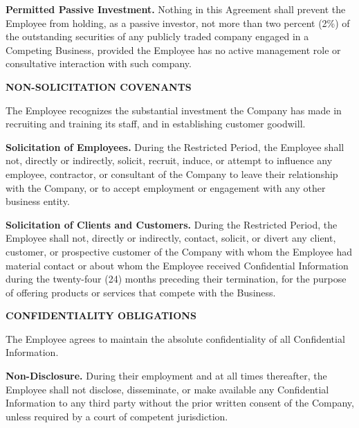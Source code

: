 \documentclass[11pt,a4paper]{article}
\begin{document}
\begin{clauses}
\begin{clauses}
        \item \textbf{Permitted Passive Investment.} Nothing in this Agreement shall prevent the Employee from holding, as a passive investor, not more than two percent (2\%) of the outstanding securities of any publicly traded company engaged in a Competing Business, provided the Employee has no active management role or consultative interaction with such company.
    \end{clauses}

    \item \textbf{NON-SOLICITATION COVENANTS}
    \label{sec:nonsolicit}
    
    The Employee recognizes the substantial investment the Company has made in recruiting and training its staff, and in establishing customer goodwill.
    
    \begin{clauses}
        \item \textbf{Solicitation of Employees.} During the Restricted Period, the Employee shall not, directly or indirectly, solicit, recruit, induce, or attempt to influence any employee, contractor, or consultant of the Company to leave their relationship with the Company, or to accept employment or engagement with any other business entity.
        
        \item \textbf{Solicitation of Clients and Customers.} During the Restricted Period, the Employee shall not, directly or indirectly, contact, solicit, or divert any client, customer, or prospective customer of the Company with whom the Employee had material contact or about whom the Employee received Confidential Information during the twenty-four (24) months preceding their termination, for the purpose of offering products or services that compete with the Business.
    \end{clauses}

    \item \textbf{CONFIDENTIALITY OBLIGATIONS}
    \label{sec:confidentiality}
    
    The Employee agrees to maintain the absolute confidentiality of all Confidential Information.
    
    \begin{clauses}
        \item \textbf{Non-Disclosure.} During their employment and at all times thereafter, the Employee shall not disclose, disseminate, or make available any Confidential Information to any third party without the prior written consent of the Company, unless required by a court of competent jurisdiction.
        

\end{clauses}
\end{clauses}
\end{document}
